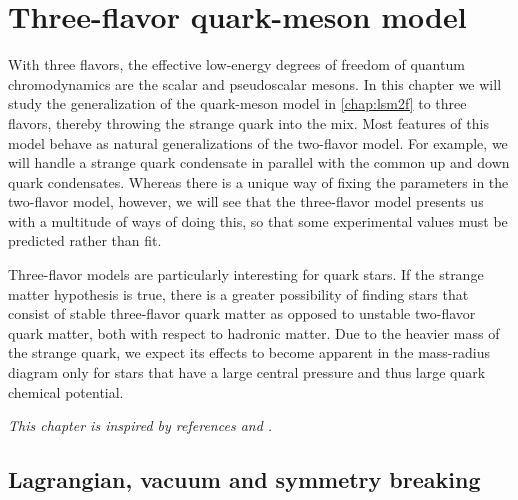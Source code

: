 \chapter{Three-flavor quark-meson model}
\label{chap:lsm3f}

With three flavors, the effective low-energy degrees of freedom of quantum chromodynamics are the scalar and pseudoscalar mesons. %
In this chapter we will study the generalization of the quark-meson model in \cref{chap:lsm2f} to three flavors,
thereby throwing the strange quark into the mix.
Most features of this model behave as natural generalizations of the two-flavor model.
For example, we will handle a strange quark condensate in parallel with the common up and down quark condensates.
Whereas there is a unique way of fixing the parameters in the two-flavor model, however,
we will see that the three-flavor model presents us with a multitude of ways of doing this,
so that some experimental values must be predicted rather than fit.

Three-flavor models are particularly interesting for quark stars.
If the strange matter hypothesis is true,
there is a greater possibility of finding stars that consist of stable three-flavor quark matter
as opposed to unstable two-flavor quark matter, both with respect to hadronic matter.
Due to the heavier mass of the strange quark,
we expect its effects to become apparent in the mass-radius diagram
only for stars that have a large central pressure and thus large quark chemical potential.

\textit{This chapter is inspired by references \cite{ref:lsm3f} and \cite{ref:lsm3f_details}.}

\section{Lagrangian, vacuum and symmetry breaking}

